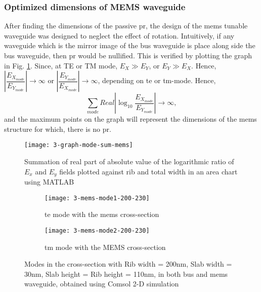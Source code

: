 \documentclass[../report.tex]{subfiles}
\begin{document}
\subsubsection{Optimized dimensions of MEMS waveguide}
After finding the dimensions of the passive \gls{pr}, the design of the \gls{mems} tunable waveguide was designed to neglect the effect of rotation. Intuitively, if any waveguide which is the mirror image of the bus waveguide is place along side the bus waveguide, then \gls{pr} would be nullified. This is verified by plotting the graph in Fig. \ref{fig:3_graph_mode_sum_mems}. Since, at TE or TM mode, $E_X \gg E_Y$, or $E_Y \gg E_X$. Hence, $\left|\dfrac {E_{X_{mode}}} {E_{Y_{mode}}}\right| \rightarrow \infty$ or $\left|\dfrac {E_{Y_{mode}}} {E_{X_{mode}}}\right| \rightarrow \infty$, depending on \gls{te} or \gls{tm}-mode.
Hence, 
\begin{equation}\label{eq:mems_dim_eq}
\sum _{mode}Real\left| \log _{10}\dfrac {E_{X_{mode}}} {E_{Y_{mode}}}\right| \rightarrow \infty,
\end{equation}
and the maximum points on the graph will represent the dimensions of the \gls{mems} structure for which, there is no \gls{pr}.

\begin{figure}[H] %
	\centering
	\texttt{[image: 3-graph-mode-sum-mems]}
	\caption{Summation of real part of absolute value of the logarithmic ratio of $E_x$ and $E_y$ fields plotted against rib and total width in an area chart using MATLAB}
	\label{fig:3_graph_mode_sum_mems}
\end{figure}
		
\begin{figure}[H] %
	\begin{subfigure}[t]{0.45\textwidth}
		\texttt{[image: 3-mems-mode1-200-230]}
		\caption{\gls{te} mode with the \gls{mems} cross-section}
		\label{fig:3_mems_mode1_200_230}
	\end{subfigure}
	\hfill
	\begin{subfigure}[t]{0.45\textwidth}
		\texttt{[image: 3-mems-mode2-200-230]}
		\caption{\gls{tm} mode with the MEMS cross-section}
		\label{fig:3-mems-mode2-200-230}
	\end{subfigure}
	\caption{Modes in the cross-section with Rib width = 200nm, Slab width = 30nm, Slab height = Rib height = 110nm, in both bus and \gls{mems} waveguide, obtained using Comsol 2-D simulation}
\end{figure}
\end{document}
